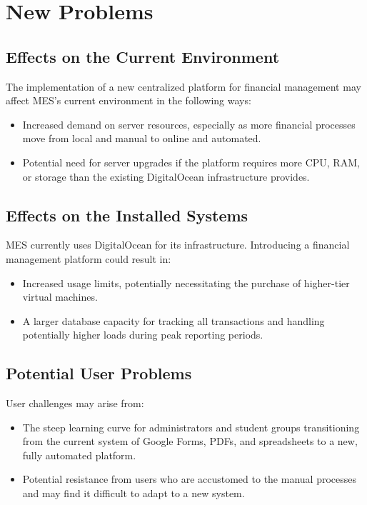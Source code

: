 \documentclass[12pt]{article}
\begin{document}
\section{New Problems}
\subsection{Effects on the Current Environment}
The implementation of a new centralized platform for financial management may affect MES's current environment in the following ways:
\begin{itemize}
    \item Increased demand on server resources, especially as more financial processes move from local and manual to online and automated.
    \item Potential need for server upgrades if the platform requires more CPU, RAM, or storage than the existing DigitalOcean infrastructure provides.
\end{itemize}

\subsection{Effects on the Installed Systems}
MES currently uses DigitalOcean for its infrastructure. Introducing a financial management platform could result in:
\begin{itemize}
    \item Increased usage limits, potentially necessitating the purchase of higher-tier virtual machines.
    \item A larger database capacity for tracking all transactions and handling potentially higher loads during peak reporting periods.
\end{itemize}

\subsection{Potential User Problems}
User challenges may arise from:
\begin{itemize}
    \item The steep learning curve for administrators and student groups transitioning from the current system of Google Forms, PDFs, and spreadsheets to a new, fully automated platform.
    \item Potential resistance from users who are accustomed to the manual processes and may find it difficult to adapt to a new system.
\end{itemize}
\end{document}
